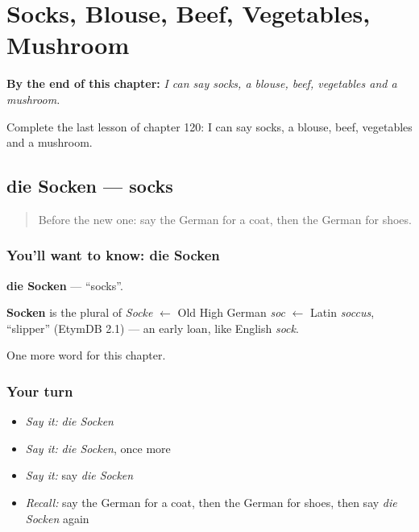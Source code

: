 
\chapter{Socks, Blouse, Beef, Vegetables, Mushroom}
\label{ch:ge-socks-blouse-beef-vegetables-mushroom}

\begin{chapteropening}
\textbf{By the end of this chapter:} \emph{I can say socks, a blouse, beef, vegetables and a mushroom.}

Complete the last lesson of chapter 120: I can say socks, a blouse, beef, vegetables and a mushroom.
\end{chapteropening}

\section[die Socken]{die Socken — socks}

\label{lesson:GE-C120-socken}



\begin{quote}
Before the new one: say the German for a coat, then the German for shoes.
\end{quote}

\subsection*{You'll want to know: die Socken}
\textbf{die Socken} — \textquotedblleft{}socks\textquotedblright{}.

\begin{cousinweb}
\textbf{Socken} is the plural of \emph{Socke} $\leftarrow$ Old High German \emph{soc} $\leftarrow$ Latin \emph{soccus}, \textquotedblleft{}slipper\textquotedblright{} (EtymDB 2.1) — an early loan, like English \emph{sock}.
\end{cousinweb}

\begin{grammarlens}[title={What you've built}]
One more word for this chapter.
\end{grammarlens}

\subsection*{Your turn}
\begin{itemize}
\raggedright
  \item \emph{Say it:} \emph{die Socken}
  \item \emph{Say it:} \emph{die Socken}, once more
  \item \emph{Say it:} say \emph{die Socken}
  \item \emph{Recall:} say the German for a coat, then the German for shoes, then say \emph{die Socken} again
\end{itemize}

